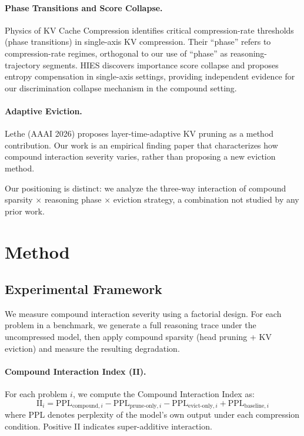 \documentclass[11pt,a4paper]{article}
\begin{document}
\paragraph{Phase Transitions and Score Collapse.}
Physics of KV Cache Compression \cite{physics2026} identifies critical compression-rate thresholds (phase transitions) in single-axis KV compression. Their ``phase'' refers to compression-rate regimes, orthogonal to our use of ``phase'' as reasoning-trajectory segments. HIES \cite{hies2025} discovers importance score collapse and proposes entropy compensation in single-axis settings, providing independent evidence for our discrimination collapse mechanism in the compound setting.

\paragraph{Adaptive Eviction.}
Lethe (AAAI 2026) proposes layer-time-adaptive KV pruning as a method contribution. Our work is an empirical finding paper that characterizes how compound interaction severity varies, rather than proposing a new eviction method.

Our positioning is distinct: we analyze the three-way interaction of compound sparsity $\times$ reasoning phase $\times$ eviction strategy, a combination not studied by any prior work.

\section{Method}

\subsection{Experimental Framework}

We measure compound interaction severity using a factorial design. For each problem in a benchmark, we generate a full reasoning trace under the uncompressed model, then apply compound sparsity (head pruning + KV eviction) and measure the resulting degradation.

\paragraph{Compound Interaction Index (II).}
For each problem $i$, we compute the Compound Interaction Index as:
\begin{equation}
    \text{II}_i = \text{PPL}_{\text{compound},i} - \text{PPL}_{\text{prune-only},i} - \text{PPL}_{\text{evict-only},i} + \text{PPL}_{\text{baseline},i}
\end{equation}
where PPL denotes perplexity of the model's own output under each compression condition. Positive II indicates super-additive interaction.
\end{document}
